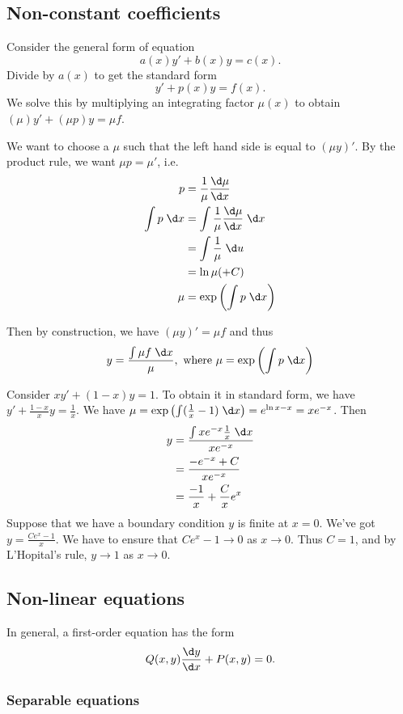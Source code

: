 \documentclass[a4paper]{article}
\begin{document}
\subsection{Non-constant coefficients}
Consider the general form of equation
\[
a(x)y' + b(x)y = c(x).
\]
Divide by $a(x)$ to get the standard form
\[
y' + p(x) y  = f(x).
\]
We solve this by multiplying an integrating factor $\mu (x)$ to obtain $(\mu)y' + (\mu p)y = \mu f$.

We want to choose a $\mu$ such that the left hand side is equal to $(\mu y)'$. By the product rule, we want $\mu p = \mu'$, i.e.
\begin{align*}
  p &= \frac{1}{\mu}\frac{\d\mu }{\d x}\\
  \int p\; \d x &= \int \frac{1}{\mu}\frac{\d \mu}{\d x} \; \d x\\
  &= \int \frac{1}{\mu}\; \d u\\
  &= \ln \mu (+ C)\\
  \mu &= \exp\left(\int p\; \d x\right)
\end{align*}

Then by construction, we have $(\mu y)' = \mu f$ and thus
\[
y = \frac{\int \mu f\;\d x}{\mu},\text{ where } \mu = \exp\left(\int p\; \d x\right)
\]
\begin{eg}
  Consider $xy' + (1 - x)y = 1$. To obtain it in standard form, we have $y' + \frac{1 - x}{x} y = \frac{1}{x}$.
We have $\mu = \exp\left(\int (\frac{1}{x} - 1)\; \d x\right) = e^{\ln x - x} = xe^{-x}$. Then 
\begin{align*}
  y &= \frac{\int xe^{-x}\frac{1}{x}\;\d x}{xe^{-x}}\\
  &= \frac{-e^{-x} + C}{xe^{-x}}\\
  &= \frac{-1}{x} + \frac{C}{x}e^x
\end{align*}
Suppose that we have a boundary condition $y$ is finite at $x = 0$. We've got $y = \frac{Ce^x - 1}{x}$. We have to ensure that $Ce^x - 1\to 0$ as $x\to 0$. Thus $C = 1$, and by L'Hopital's rule, $y\to 1$ as $x\to 0$.
\end{eg}

\subsection{Non-linear equations}
In general, a first-order equation has the form
\[
Q(x, y)\frac{\d y}{\d x} + P(x, y) = 0.
\]
\subsubsection{Separable equations}
\end{document}
